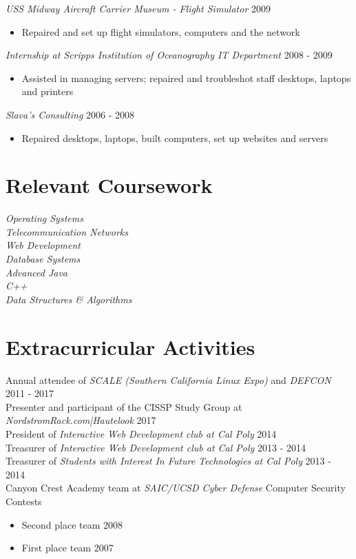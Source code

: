 \documentclass[line]{tex/res}
\begin{document}
\begin{resume}
	{\sl USS Midway Aircraft Carrier Museum - Flight Simulator} \hfill 2009
	\begin{itemize} \itemsep -2pt
		\item Repaired and set up flight simulators, computers and the network
	\end{itemize}

	{\sl Internship at Scripps Institution of Oceanography IT Department} \hfill 2008 - 2009
	\begin{itemize} \itemsep -2pt
		\item Assisted in managing servers; repaired and troubleshot staff desktops, laptops and printers
	\end{itemize}

	{\sl Slava's Consulting} \hfill 2006 - 2008
	\begin{itemize} \itemsep -2pt
		\item Repaired desktops, laptops, built computers, set up websites and servers
	\end{itemize}

\section{Relevant Coursework}
	{\sl Operating Systems } \\
	{\sl Telecommunication Networks } \\
	{\sl Web Development } \\
	{\sl Database Systems } \\
	{\sl Advanced Java} \\
	{\sl C++} \\
	{\sl Data Structures \& Algorithms}

\section{Extracurricular Activities}
    Annual attendee of {\it SCALE (Southern California Linux Expo)} and {\it DEFCON} \hfill 2011 - 2017 \\
    Presenter and participant of the CISSP Study Group at {\it NordstromRack.com|Hautelook} \hfill 2017 \\
	President of {\it Interactive Web Development club at Cal Poly} \hfill 2014 \\
	Treasurer of {\it Interactive Web Development club at Cal Poly} \hfill 2013 - 2014 \\
	Treasurer of {\it Students with Interest In Future Technologies at Cal Poly} \hfill 2013 - 2014 \\
	Canyon Crest Academy team at {\it SAIC/UCSD Cyber Defense} Computer Security Contests
	\begin{itemize} \itemsep -2pt
		\item Second place team \hfill 2008
		\item First place team \hfill 2007
	\end{itemize}

\end{resume}
\end{document}
